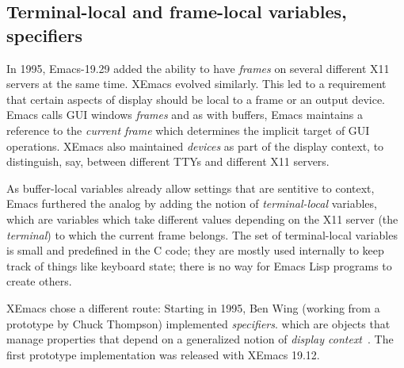 \documentclass[format=acmsmall, review]{acmart}
\newcommand \Elisp {Emacs Lisp}
\begin{document}






\subsection{Terminal-local and frame-local variables, specifiers}

In 1995, Emacs-19.29 added the ability to have \emph{frames} on
several different X11 servers at the same time.  XEmacs evolved
similarly.  This led to a requirement that certain aspects of display
should be local to a frame or an output device.  Emacs calls GUI
windows \emph{frames} and as with buffers, Emacs maintains a reference
to the \emph{current frame} which determines the implicit target of
GUI operations.  XEmacs also maintained \emph{devices} as part of
the display context, to distinguish, say, between different TTYs and
different X11 servers.

As buffer-local variables already allow settings that are sentitive to
context, Emacs furthered the analog by adding the notion of
\emph{terminal-local} variables, which are variables which take
different values depending on the X11 server (the \emph{terminal}) to
which the current frame belongs.  The set of terminal-local variables
is small and predefined in the C code; they are mostly used internally
to keep track of things like keyboard state; there is no way for
\Elisp{} programs to create others.

XEmacs chose a different route: Starting in 1995, Ben Wing (working
from a prototype by Chuck Thompson) implemented
\emph{specifiers}. which are objects that manage properties that
depend on a generalized notion of \emph{display
  context}~\cite{XEmacsLispRef1998}.  The first prototype
implementation was released with XEmacs 19.12.
\end{document}
